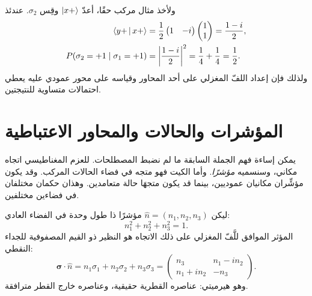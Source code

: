 ولأخذ مثال مركب حقًا، أعدّ \(\left\lvert x+\right\rangle\) وقِس \(\sigma_2\). عندئذ
\begin{align}
  \left\langle y+\,\middle|\,x+\right\rangle
  &=
  \frac12
  \begin{pmatrix}1&-i\end{pmatrix}
  \begin{pmatrix}1\\1\end{pmatrix}
  =\frac{1-i}{2},
  \notag\\
  P(\sigma_2=+1\mid\sigma_1=+1)
  &=\left|\frac{1-i}{2}\right|^2
  =\frac14+\frac14
  =\frac12.
  \label{eq:l03-complex-probability-example}
\end{align}
ولذلك فإن إعداد اللفّ المغزلي على أحد المحاور وقياسه على محور عمودي عليه يعطي احتمالات متساوية للنتيجتين.

\section{المؤشرات والحالات والمحاور الاعتباطية}

يمكن إساءة فهم الجملة السابقة ما لم نضبط المصطلحات. للعزم المغناطيسي اتجاه مكاني، وسنسميه \emph{مؤشرًا}. وأما الكيت فهو متجه في فضاء الحالات المركب. وقد يكون مؤشِّران مكانيان عموديين، بينما قد يكون متجهَا حالة متعامدين. وهذان حكمان مختلفان في فضاءين مختلفين.

\begin{classroomqa}
\end{classroomqa}

\begin{classroomqa}
\end{classroomqa}

ليكن \(\hat n=(n_1,n_2,n_3)\) مؤشرًا ذا طول وحدة في الفضاء العادي:
\begin{equation}
  n_1^2+n_2^2+n_3^2=1.
\end{equation}
المؤثر الموافق للَّفّ المغزلي على ذلك الاتجاه هو النظير ذو القيم المصفوفية للجداء النقطي:
\begin{equation}
  \boldsymbol{\sigma}\cdot\hat n
  =
  n_1\sigma_1+n_2\sigma_2+n_3\sigma_3
  =
  \begin{pmatrix}
    n_3&n_1-in_2\\
    n_1+in_2&-n_3
  \end{pmatrix}.
  \label{eq:l03-spin-arbitrary-axis}
\end{equation}
وهو هيرميتي: عناصره القطرية حقيقية، وعناصره خارج القطر مترافقة.

